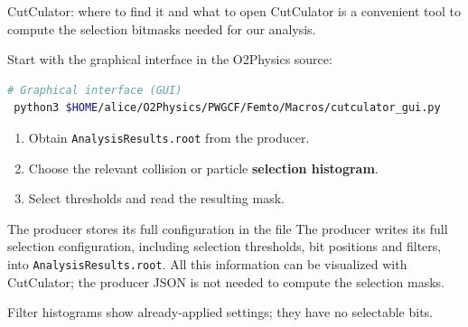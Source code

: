 \begin{frame}[fragile,shrink=8]{CutCulator: where to find it and what to open}
        CutCulator is a convenient tool to compute the selection
        bitmasks needed for our analysis.
        \medskip\par
        Start with the graphical interface in the O2Physics source:
 \begin{lstlisting}[language=bash]
 # Graphical interface (GUI)
 python3 $HOME/alice/O2Physics/PWGCF/Femto/Macros/cutculator_gui.py
 \end{lstlisting}
        \begin{enumerate}
                \item Obtain \texttt{AnalysisResults.root} from the producer.
                \item Choose the relevant collision or particle
                        \textbf{selection histogram}.
                \item Select thresholds and read the resulting mask.
        \end{enumerate}
        \begin{block}{The producer stores its full configuration in the file}
                The producer writes its full selection configuration,
                including selection thresholds, bit positions and filters,
                into \texttt{AnalysisResults.root}. All this information
                can be visualized with CutCulator; the producer JSON is
                not needed to compute the selection masks.
        \end{block}
        \small Filter histograms show already-applied settings; they
        have no selectable bits.
\end{frame}

